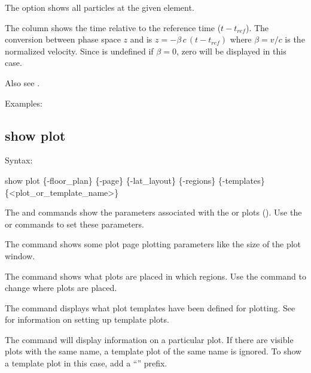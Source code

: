 {{{{{{{{{{The  option shows all particles at the given element.

The  column shows the time relative to the reference time ($t - t_{ref}$). The conversion
between phase space $z$ and  is $z = -\beta \, c \, (t - t_{ref})$ where $\beta = v/c$ is
the normalized velocity. Since  is undefined if $\beta = 0$, zero will be displayed in
this case.

Also see .

Examples:


\subsection{show plot}
\label{s:show.plot}

Syntax:
\begin{example}
  show plot \{-floor_plan\} \{-page\} \{-lat_layout\} \{-regions\} 
            \{-templates\} \{<plot_or_template_name>\}
\end{example}

The  and  commands show the parameters
associated with the  or  plots (). Use the  or  commands to set these parameters.

The  command shows some plot page plotting parameters like the size of the plot
window.

The  command shows what plots are placed in which regions. Use the 
command to change where plots are placed.

The  command displays what plot templates have been defined for plotting.
See  for information on setting up template plots.

The  command will display information on a particular plot. If
there are visible plots with the same name, a template plot of the same name is ignored. To show a
template plot in this case, add a ``'' prefix.

}}}}}}}}}}
